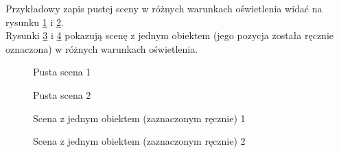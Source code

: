 Przykładowy zapis pustej sceny w różnych warunkach oświetlenia widać na rysunku \ref{fig:scene_empty_1} i \ref{fig:scene_empty_2}.\\

Rysunki \ref{fig:scene_with_one_obstacle_1} i \ref{fig:scene_with_one_obstacle_2} pokazują scenę z jednym obiektem (jego pozycja została ręcznie oznaczona) w różnych warunkach oświetlenia.\\

\begin{figure}
 \centering
 \makebox[\textwidth][l]{
  \resizebox{.9\largefigure}{!}{
    \def\svgwidth{0.9\largefigure}
    
  }
 }
 \caption{Pusta scena 1}
 \label{fig:scene_empty_1}
\end{figure}

\begin{figure}
 \centering
 \makebox[\textwidth][l]{
  \resizebox{.9\largefigure}{!}{
    \def\svgwidth{0.9\largefigure}
    
  }
 }
 \caption{Pusta scena 2}
 \label{fig:scene_empty_2}
\end{figure}

\begin{figure}
 \centering
 \makebox[\textwidth][r]{
  \resizebox{.9\largefigure}{!}{
    \def\svgwidth{0.9\largefigure}
    
  }
 }
 \caption{Scena z jednym obiektem (zaznaczonym ręcznie) 1}
 \label{fig:scene_with_one_obstacle_1}
\end{figure}

\begin{figure}
 \centering
 \makebox[\textwidth][r]{
  \resizebox{.9\largefigure}{!}{
    \def\svgwidth{0.9\largefigure}
    
  }
 }
 \caption{Scena z jednym obiektem (zaznaczonym ręcznie) 2}
 \label{fig:scene_with_one_obstacle_2}
\end{figure}
